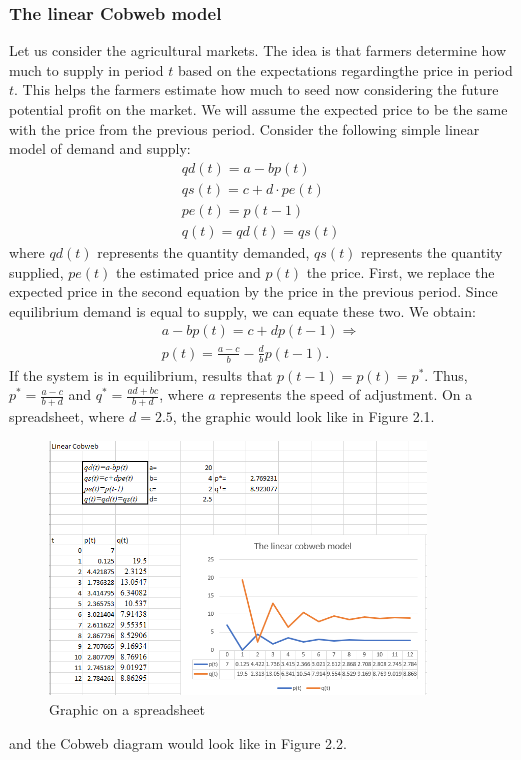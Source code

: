 \documentclass[a4paper,12pt]{report}
\begin{document}
\subsubsection{The linear Cobweb model}
Let us consider the agricultural markets. The idea is that farmers determine how much to supply in period $t$ based on the expectations regardingthe price in period $t$. This helps the farmers estimate how much to seed now considering the future potential profit on the market.
We will assume the expected price to be the same with the price from the previous period. Consider the following simple linear model of demand and supply:
\begin{align}
 qd(t)=a-bp(t) \\
 qs(t)=c+d\cdot pe(t)\\
 pe(t)=p(t-1)\\
 q(t)=qd(t)=qs(t)
\end{align}
where $qd(t)$ represents the quantity demanded, $qs(t)$ represents the quantity supplied, $pe(t)$ the estimated price and $p(t)$ the price. First, we replace the expected price in the second equation by the price in the previous period. Since equilibrium demand is equal to supply, we can equate these two. We obtain:
\begin{align*}
 a-bp(t)=c+dp(t-1)\Rightarrow \\
 p(t)=\frac{a-c}{b}-\frac{d}{b}p(t-1).
\end{align*}
If the system is in equilibrium, results that $p(t-1)=p(t)=p^{*}$. Thus, $p^{*}=\frac{a-c}{b+d}$ and $q^{*}=\frac{ad+bc}{b+d}$, where $a$ represents the speed of adjustment.
On a spreadsheet, where $d=2.5$, the graphic would look like in Figure 2.1.
\begin{figure}[h]\label{cobweb}
\caption{Graphic on a spreadsheet}
\centering
 \includegraphics[width=10cm]{Cobweb.PNG}
\end{figure}
and the Cobweb diagram would look like in Figure 2.2.
\end{document}
